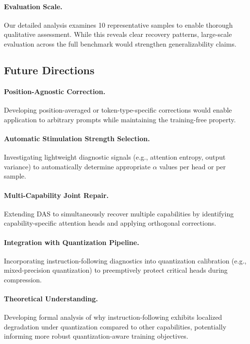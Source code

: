 \paragraph{Evaluation Scale.}
Our detailed analysis examines 10 representative samples to enable thorough 
qualitative assessment. While this reveals clear recovery patterns, large-scale 
evaluation across the full benchmark would strengthen generalizability claims.

\subsection{Future Directions}

\paragraph{Position-Agnostic Correction.}
Developing position-averaged or token-type-specific corrections would enable 
application to arbitrary prompts while maintaining the training-free property.

\paragraph{Automatic Stimulation Strength Selection.}
Investigating lightweight diagnostic signals (e.g., attention entropy, output 
variance) to automatically determine appropriate $\alpha$ values per head or 
per sample.

\paragraph{Multi-Capability Joint Repair.}
Extending DAS to simultaneously recover multiple capabilities by identifying 
capability-specific attention heads and applying orthogonal corrections.

\paragraph{Integration with Quantization Pipeline.}
Incorporating instruction-following diagnostics into quantization calibration 
(e.g., mixed-precision quantization) to preemptively protect critical heads 
during compression.

\paragraph{Theoretical Understanding.}
Developing formal analysis of why instruction-following exhibits localized 
degradation under quantization compared to other capabilities, potentially 
informing more robust quantization-aware training objectives.